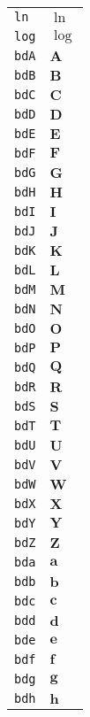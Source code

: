 \begin{longtable}{ll}
\texttt{ln}&${}\ln {}$\\
\texttt{log}&${}\log {}$\\
\texttt{bdA}&${}{\textbf{A}}{}$\\
\texttt{bdB}&${}{\textbf{B}}{}$\\
\texttt{bdC}&${}{\textbf{C}}{}$\\
\texttt{bdD}&${}{\textbf{D}}{}$\\
\texttt{bdE}&${}{\textbf{E}}{}$\\
\texttt{bdF}&${}{\textbf{F}}{}$\\
\texttt{bdG}&${}{\textbf{G}}{}$\\
\texttt{bdH}&${}{\textbf{H}}{}$\\
\texttt{bdI}&${}{\textbf{I}}{}$\\
\texttt{bdJ}&${}{\textbf{J}}{}$\\
\texttt{bdK}&${}{\textbf{K}}{}$\\
\texttt{bdL}&${}{\textbf{L}}{}$\\
\texttt{bdM}&${}{\textbf{M}}{}$\\
\texttt{bdN}&${}{\textbf{N}}{}$\\
\texttt{bdO}&${}{\textbf{O}}{}$\\
\texttt{bdP}&${}{\textbf{P}}{}$\\
\texttt{bdQ}&${}{\textbf{Q}}{}$\\
\texttt{bdR}&${}{\textbf{R}}{}$\\
\texttt{bdS}&${}{\textbf{S}}{}$\\
\texttt{bdT}&${}{\textbf{T}}{}$\\
\texttt{bdU}&${}{\textbf{U}}{}$\\
\texttt{bdV}&${}{\textbf{V}}{}$\\
\texttt{bdW}&${}{\textbf{W}}{}$\\
\texttt{bdX}&${}{\textbf{X}}{}$\\
\texttt{bdY}&${}{\textbf{Y}}{}$\\
\texttt{bdZ}&${}{\textbf{Z}}{}$\\
\texttt{bda}&${}{\textbf{a}}{}$\\
\texttt{bdb}&${}{\textbf{b}}{}$\\
\texttt{bdc}&${}{\textbf{c}}{}$\\
\texttt{bdd}&${}{\textbf{d}}{}$\\
\texttt{bde}&${}{\textbf{e}}{}$\\
\texttt{bdf}&${}{\textbf{f}}{}$\\
\texttt{bdg}&${}{\textbf{g}}{}$\\
\texttt{bdh}&${}{\textbf{h}}{}$\\

\end{longtable}

